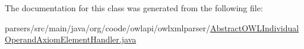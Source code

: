 The documentation for this class was generated from the following file\-:\begin{DoxyCompactItemize}
\item 
parsers/src/main/java/org/coode/owlapi/owlxmlparser/\hyperlink{_abstract_o_w_l_individual_operand_axiom_element_handler_8java}{Abstract\-O\-W\-L\-Individual\-Operand\-Axiom\-Element\-Handler.\-java}\end{DoxyCompactItemize}
